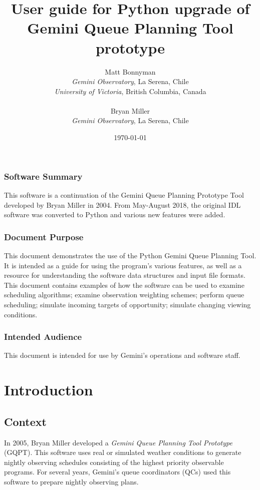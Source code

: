 \documentclass{article}
\title{User guide for Python upgrade of \\Gemini Queue Planning Tool prototype}
\author{Matt Bonnyman \\ \textit{Gemini Observatory}, La Serena, Chile \\ \textit{University of Victoria}, British Columbia, Canada \\\\
Bryan Miller \\ \textit{Gemini Observatory}, La Serena, Chile}
\date{\today}
\begin{document}
\maketitle

\vspace{5mm}

\subsubsection*{Software Summary}
This software is a continuation of the Gemini Queue Planning Prototype Tool developed by Bryan Miller in 2004.  From May-August 2018, the original IDL software was converted to Python and various new features were added.

\subsubsection*{Document Purpose}
This document demonstrates the use of the Python Gemini Queue Planning Tool.  It is intended as a guide for using the program's various features, as well as a resource for understanding the software data structures and input file formats.  This document contains examples of how the software can be used to examine scheduling algorithms; examine observation weighting schemes; perform queue scheduling; simulate incoming targets of opportunity; simulate changing viewing conditions. 

\subsubsection*{Intended Audience}
This document is intended for use by Gemini's operations and software staff.   

\clearpage
\tableofcontents

\clearpage
\section{Introduction}
\subsection{Context}
\label{sec:context}
In 2005, Bryan Miller developed a \textit{Gemini Queue Planning Tool Prototype} (GQPT).   This software uses real or simulated weather conditions to generate nightly observing schedules consisting of the highest priority observable programs.  For several years, Gemini's queue coordinators (QCs) used this software to prepare nightly observing plans.  
\end{document}
